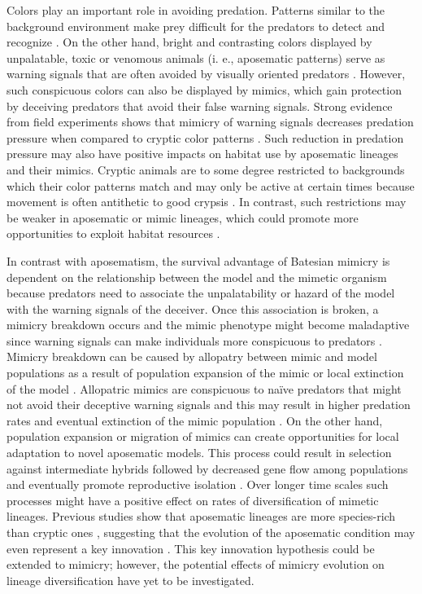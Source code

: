 Colors play an important role in avoiding predation. Patterns similar to the background environment make prey difficult for the predators to detect and recognize \citep{merilaita_2005, stevens_2009}. On the other hand, bright and contrasting colors displayed by unpalatable, toxic or venomous animals (i. e., aposematic patterns) serve as warning signals that are often avoided by visually oriented predators \citep{wallace_1867, mappes_2005, speed_2005}. However, such conspicuous colors can also be displayed by mimics, which gain protection by deceiving predators that avoid their false warning signals. Strong evidence from field experiments shows that mimicry of warning signals decreases predation pressure when compared to cryptic color patterns \citep{jeffords_batesian_1979, brodie_differential_1993, brodie_experimental_1995, pfennig_2001, pinheiro_2011, pfennig_2015}. Such reduction in predation pressure may also have positive impacts on habitat use by aposematic lineages and their mimics. Cryptic animals are to some degree restricted to backgrounds which their color patterns match and may only be active at certain times because movement is often antithetic to good crypsis \citep{speed_2010, stevens_2012
}. In contrast, such restrictions may be weaker in aposematic or mimic lineages, which could promote more opportunities to exploit habitat resources \citep{speed_2010}.

In contrast with aposematism, the survival advantage of Batesian mimicry is dependent on the relationship between the model and the mimetic organism because predators need to associate the unpalatability or hazard of the model with the warning signals of the deceiver. Once this association is broken, a mimicry breakdown occurs and the mimic phenotype might become maladaptive since warning signals can make individuals more conspicuous to predators \citep{mallet_evolution_1999, pfennig_2001, pfennig_2015}. Mimicry breakdown can be caused by allopatry between mimic and model populations as a result of population expansion of the mimic or local extinction of the model \citep{pfennig_2010}. Allopatric mimics are conspicuous to naïve predators that might not avoid their deceptive warning signals and this may result in higher predation rates and eventual extinction of the mimic population \citep{pfennig_2015}. On the other hand, population expansion or migration of mimics can create opportunities for local adaptation to novel aposematic models. This process could result in selection against intermediate hybrids followed by decreased gene flow among populations and eventually promote reproductive isolation \citep{mallet_evolution_1999, pfennig_2015}. Over longer time scales such processes might have a positive effect on rates of diversification of mimetic lineages. Previous studies show that aposematic lineages are more species-rich than cryptic ones \citep{santos_2003, przeczek_2008}, suggesting that the evolution of the aposematic condition may even represent a key innovation \citep{speed_2010}. This key innovation hypothesis could be extended to mimicry; however, the potential effects of mimicry evolution on lineage diversification have yet to be investigated.

